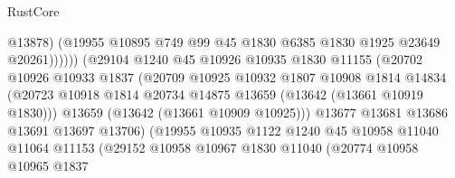 \begin{lexlean}{RustCore}
\begin{coremodule}
                                        @13878)
                                      (@19955
                                        @10895
                                        @749
                                        @99
                                        @45
                                        @1830
                                        @6385
                                        @1830
                                        @1925
                                        @23649
                                        @20261))))))
                            (@29104
                              @1240
                              @45
                              @10926
                              @10935
                              @1830
                              @11155
                              (@20702
                                @10926
                                @10933
                                @1837
                                (@20709
                                  @10925
                                  @10932
                                  @1807
                                  @10908
                                  @1814
                                  @14834
                                  (@20723
                                    @10918
                                    @1814
                                    @20734
                                    @14875
                                    @13659
                                    (@13642 (@13661 @10919 @1830)))
                                  @13659
                                  (@13642 (@13661 @10909 @10925)))
                                @13677
                                @13681
                                @13686
                                @13691
                                @13697
                                @13706)
                              (@19955
                                @10935
                                @1122
                                @1240
                                @45
                                @10958
                                @11040
                                @11064
                                @11153
                                (@29152
                                  @10958
                                  @10967
                                  @1830
                                  @11040
                                  (@20774
                                    @10958
                                    @10965
                                    @1837

\end{coremodule}
\end{lexlean}

